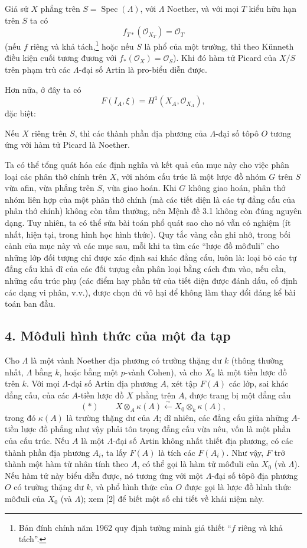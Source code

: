  Giả sử $X$ phẳng trên
$S=\operatorname{Spec}(\Lambda)$, với $\Lambda$ Noether, và với mọi $T$ kiểu
hữu hạn trên $S$ ta có
\[
  f_{T*}(\mathcal O_{X_T})=\mathcal O_T
\]
(nếu $f$ riêng và khả tách,\footnote{Bản đính chính năm 1962 quy định tường
minh giả thiết ``$f$ riêng và khả tách''.} hoặc nếu $S$ là phổ của một trường,
thì theo Künneth điều kiện cuối tương đương với
$f_*(\mathcal O_X)=\mathcal O_S$). Khi đó hàm tử Picard của $X/S$ trên phạm
trù các $\Lambda$-đại số Artin là pro-biểu diễn được.

Hơn nữa, ở đây ta có
\[
  F(I_A,\xi)=H^1(X_A,\mathcal O_{X_A}),
\]
đặc biệt:

 Nếu $X$ riêng trên $S$, thì các thành phần địa phương của
$\Lambda$-đại số tôpô $O$ tương ứng với hàm tử Picard là Noether.

 Ta có thể tổng quát hóa các định nghĩa và kết quả của mục
này cho việc phân loại các phân thớ chính trên $X$, với nhóm cấu trúc là một
lược đồ nhóm $G$ trên $S$ vừa afin, vừa phẳng trên $S$, vừa giao hoán. Khi $G$
không giao hoán, phân thớ nhóm liên hợp của một phân thớ chính (mà các tiết
diện là các tự đẳng cấu của phân thớ chính) không còn tầm thường, nên Mệnh đề
3.1 không còn đúng nguyên dạng. Tuy nhiên, ta có thể sửa bài toán phổ quát sao
cho nó vẫn có nghiệm (ít nhất, hiện tại, trong hình học hình thức). Quy tắc
vàng cần ghi nhớ, trong bối cảnh của mục này và các mục sau, mỗi khi
ta tìm các ``lược đồ môđuli'' cho những lớp đối tượng chỉ được xác định sai
khác đẳng cấu, luôn là: loại bỏ các tự đẳng cấu khả dĩ của các đối tượng cần
phân loại bằng cách đưa vào, nếu cần, những cấu trúc phụ (các điểm hay phần tử
của tiết diện được đánh dấu, cố định các dạng vi phân, v.v.), được chọn đủ vô
hại để không làm thay đổi đáng kể bài toán ban đầu.

\subsection*{4. Môđuli hình thức của một đa tạp}

Cho $\Lambda$ là một vành Noether địa phương có trường thặng dư $k$ (thông
thường nhất, $\Lambda$ bằng $k$, hoặc bằng một $p$-vành Cohen), và cho $X_0$
là một tiền lược đồ trên $k$. Với mọi $\Lambda$-đại số Artin địa phương $A$,
xét tập $F(A)$ các lớp, sai khác đẳng cấu, của các $A$-tiền lược đồ $X$ phẳng
trên $A$, được trang bị một đẳng cấu
\[
  (*)\qquad
  X\otimes_A\kappa(A)\xleftarrow{\sim}
  X_0\otimes_k\kappa(A),
\]
trong đó $\kappa(A)$ là trường thặng dư của $A$; dĩ nhiên, các đẳng cấu giữa
những $A$-tiền lược đồ phẳng như vậy phải tôn trọng đẳng cấu vừa nêu, vốn là
một phần của cấu trúc. Nếu $A$ là một $\Lambda$-đại số Artin không nhất thiết
địa phương, có các thành phần địa phương $A_i$, ta lấy $F(A)$ là tích các
$F(A_i)$. Như vậy, $F$ trở thành một hàm tử nhân tính theo $A$, có thể gọi là
hàm tử môđuli của $X_0$ (và $\Lambda$). Nếu hàm tử này biểu diễn được, nó tương
ứng với một $\Lambda$-đại số tôpô địa phương $O$ có trường thặng dư $k$, và
phổ hình thức của $O$ được gọi là lược đồ hình thức môđuli của $X_0$ (và
$\Lambda$); xem [2] để biết một số chi tiết về khái niệm này.

